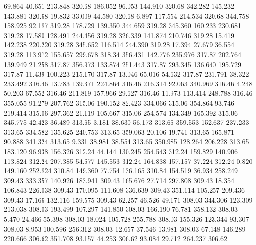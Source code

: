   69.864   40.651  213.848       320.68
 186.052   96.053  144.910       320.68
 342.282  145.232  143.881       320.68
  19.832   33.009   44.580       320.68
   6.897  117.554  214.534       320.68
 344.758  158.925   92.187       319.28
 178.729  139.350  344.659       319.28
 345.360  160.233  230.681       319.28
  17.580  128.491  244.456       319.28
 326.339  141.874  210.746       319.28
  15.419  142.238  220.220       319.28
 345.652  116.514  244.390       319.28
  17.394   27.679   36.554       319.28
 113.972  155.657  299.678       318.34
 356.431  142.776  235.976       317.87
 202.764  139.949   21.258       317.87
 356.973  133.874  251.443       317.87
 293.345  136.640  195.729       317.87
  11.439  100.223  215.170       317.87
  13.046   65.016   54.632       317.87
 231.791   38.322  233.492       316.46
  13.783  139.371  224.864       316.46
 216.314   92.063  340.969       316.46
   4.248   50.203   67.552       316.46
 211.819  157.966   29.627       316.46
  11.973  113.414  248.788       316.46
 355.055   91.279  207.762       315.06
 190.152   82.423  334.066       315.06
 354.864   93.746  219.414       315.06
 297.362   21.119  105.667       315.06
 254.574  134.349  165.392       315.06
 345.775   42.423   36.489       313.65
   3.181   38.630   56.173       313.65
 359.553  152.637  237.233       313.65
 334.582  135.625  240.753       313.65
 359.063   20.106   19.741       313.65
 165.871   90.888  341.324       313.65
   9.331   38.981   38.554       313.65
 350.985  128.264  206.228       313.65
 183.120   96.938  156.326       312.24
  44.144  130.245  254.543       312.24
 159.829  140.906  113.824       312.24
 207.385   54.577  145.553       312.24
 164.838  157.157   37.224       312.24
   0.820  149.160  252.824       310.84
 149.360   77.754  136.165       310.84
 154.519   36.934  258.249       309.43
 333.357  140.926  183.941       309.43
 165.676   27.714  297.808       309.43
  18.354  106.843  226.038       309.43
 170.095  111.608  336.639       309.43
 351.114  105.257  209.436       309.43
  17.166  132.116  159.575       309.43
  62.257   46.526   49.171       308.03
 344.306  123.309  213.038       308.03
 193.499  107.297  141.850       308.03
 166.190   76.781  358.132       308.03
   5.470   24.466   55.398       308.03
  18.024  105.728  255.788       308.03
 155.326  123.344   93.307       308.03
   8.953  100.596  256.312       308.03
  12.657   37.546   13.981       308.03
  67.148  146.289  220.666       306.62
 351.708   93.157   44.253       306.62
  93.084   29.712  264.237       306.62
